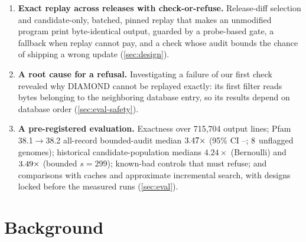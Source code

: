 \documentclass[letterpaper,twocolumn,10pt]{article}
\theoremstyle{definition}
\begin{document}
\begin{enumerate}
  \item \textbf{Exact replay across releases with check\nobreakdash-or\nobreakdash-refuse.} Release\nobreakdash-diff selection and candidate\nobreakdash-only, batched,
  pinned replay that makes an unmodified program print byte\nobreakdash-identical output, guarded by a
  probe\nobreakdash-based gate, a fallback when replay cannot pay, and a check whose audit bounds the chance of shipping a
  wrong update (\cref{sec:design}).
  \item \textbf{A root cause for a refusal.} Investigating a failure of our first check revealed why DIAMOND cannot be
  replayed exactly: its first filter reads bytes belonging to the neighboring database entry, so its results depend
  on database order (\cref{sec:eval-safety}).
  \item \textbf{A pre\nobreakdash-registered evaluation.} Exactness over 715{,}704 output lines; Pfam 38.1$\rightarrow$38.2 all\nobreakdash-record
  bounded\nobreakdash-audit median $3.47\times$ (95\% CI \HeadlineCIlow--\HeadlineCIhigh; $8$ unflagged genomes);
  historical candidate\nobreakdash-population medians $4.24\times$ (Bernoulli) and $3.49\times$ (bounded $s{=}299$);
  known\nobreakdash-bad controls that must refuse; and comparisons with caches and approximate incremental search, with designs locked
  before the measured runs (\cref{sec:eval}).
\end{enumerate}

\section{Background}
\label{sec:background}
\end{document}
